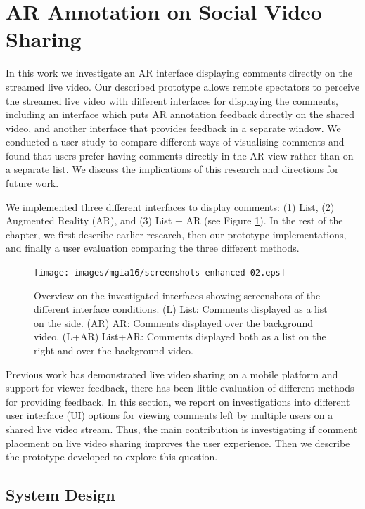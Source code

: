 
\section{AR Annotation on Social Video Sharing}
\label{sec:video}

In this work \cite{Nassani2016} we investigate an AR interface displaying comments directly on the streamed live video. Our described prototype allows remote spectators to perceive the streamed live video with different interfaces for displaying the comments, including an interface which puts AR annotation feedback directly on the shared video, and another interface that provides feedback in a separate window. We conducted a user study to compare different ways of visualising comments and found that users prefer having comments directly in the AR view rather than on a separate list. We discuss the implications of this research and directions for future work.

We implemented three different interfaces to display comments: (1) List, (2) Augmented Reality (AR), and (3) List + AR (see Figure \ref{fig:mgia16:conditions}). In the rest of the chapter, we first describe earlier research, then our prototype implementations, and finally a user evaluation comparing the three different methods.

\begin{figure}
  \texttt{[image: images/mgia16/screenshots-enhanced-02.eps]}
  \caption{Overview on the investigated interfaces showing screenshots of the different interface conditions. (L) List: Comments displayed as a list on the side. (AR) AR: Comments displayed over the background video. (L+AR) List+AR: Comments displayed both as a list on the right and over the background video. }
  \label{fig:mgia16:conditions}
\end{figure}

Previous work has demonstrated live video sharing on a mobile platform and support for viewer feedback, there has been little evaluation of different methods for providing feedback. In this section, we report on investigations into different user interface (UI) options for viewing comments left by multiple users on a shared live video stream. Thus, the main contribution is investigating if comment placement on live video sharing improves the user experience. Then we describe the prototype developed to explore this question.

\subsection{System Design}

